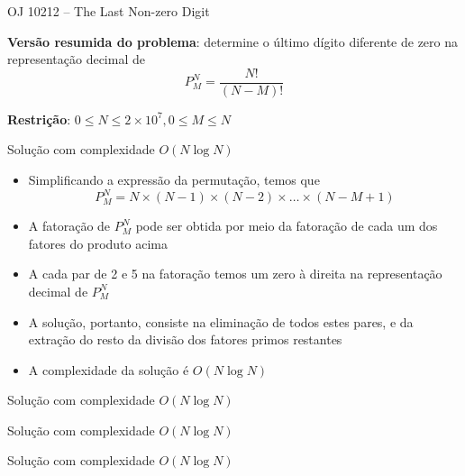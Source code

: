 \begin{frame}[fragile]{OJ 10212 -- The Last Non-zero Digit}

    \textbf{Versão resumida do problema}: determine o último dígito diferente de zero na
            representação decimal de 
        $$
            P_M^N = \frac{N!}{(N - M)!}
        $$

    \vspace{0.1in}

    \textbf{Restrição}: $0\leq N\leq 2\times 10^7, 0 \leq M\leq N$
\end{frame}

\begin{frame}[fragile]{Solução com complexidade $O(N\log N)$}

    \begin{itemize}
        \item Simplificando a expressão da permutação, temos que
        $$
            P_M^N = N \times (N - 1)\times (N - 2)\times \ldots \times (N - M + 1)
        $$

        \item A fatoração de $P_M^N$ pode ser obtida por meio da fatoração de cada um dos
            fatores do produto acima

        \item A cada par de 2 e 5 na fatoração temos um zero à direita na representação decimal
            de $P_M^N$

        \item A solução, portanto, consiste na eliminação de todos estes pares, e da extração
            do resto da divisão dos fatores primos restantes

        \item A complexidade da solução é $O(N\log N)$

    \end{itemize}

\end{frame}

\begin{frame}[fragile]{Solução com complexidade $O(N\log N)$}
\end{frame}

\begin{frame}[fragile]{Solução com complexidade $O(N\log N)$}
\end{frame}

\begin{frame}[fragile]{Solução com complexidade $O(N\log N)$}
\end{frame}
